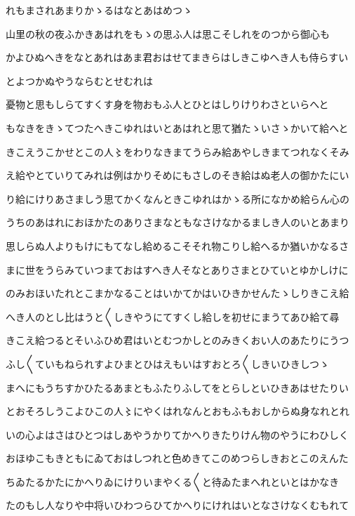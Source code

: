 \documentclass[a4paper,11pt,landscape]{ltjtarticle}
\begin{document}
\par\medskip
れもまされあまりかゝるはなとあはめつゝ
\par\medskip
山里の秋の夜ふかきあはれをもゝの思ふ人は思こそしれをのつから御心も
\par\medskip
かよひぬへきをなとあれはあま君おはせてまきらはしきこゆへき人も侍らすい
\par\medskip
とよつかぬやうならむとせむれは
\par\medskip
憂物と思もしらてすくす身を物おもふ人とひとはしりけりわさといらへと
\par\medskip
もなきをきゝてつたへきこゆれはいとあはれと思て猶たゝいさゝかいて給へと
\par\medskip
きこえうこかせとこの人〻をわりなきまてうらみ給あやしきまてつれなくそみ
\par\medskip
え給やとていりてみれは例はかりそめにもさしのそき給はぬ老人の御かたにい
\par\medskip
り給にけりあさましう思てかくなんときこゆれはかゝる所になかめ給らん心の
\par\medskip
うちのあはれにおほかたのありさまなともなさけなかるましき人のいとあまり
\par\medskip
思しらぬ人よりもけにもてなし給めるこそそれ物こりし給へるか猶いかなるさ
\par\medskip
まに世をうらみていつまておはすへき人そなとありさまとひていとゆかしけに
\par\medskip
のみおほいたれとこまかなることはいかてかはいひきかせんたゝしりきこえ給
\par\medskip
へき人のとし比はうと〱しきやうにてすくし給しを初せにまうてあひ給て尋
\par\medskip
きこえ給つるとそいふひめ君はいとむつかしとのみきくおい人のあたりにうつ
\par\medskip
ふし〱ていもねられすよひまとひはえもいはすおとろ〱しきいひきしつゝ
\par\medskip
まへにもうちすかひたるあまともふたりふしてをとらしといひきあはせたりい
\par\medskip
とおそろしうこよひこの人〻にやくはれなんとおもふもおしからぬ身なれとれ
\par\medskip
いの心よはさはひとつはしあやうかりてかへりきたりけん物のやうにわひしく
\par\medskip
おほゆこもきともにゐておはしつれと色めきてこのめつらしきおとこのえんた
\par\medskip
ちゐたるかたにかへりゐにけりいまやくる〱と待ゐたまへれといとはかなき
\par\medskip
たのもし人なりや中将いひわつらひてかへりにけれはいとなさけなくむもれて
\end{document}
